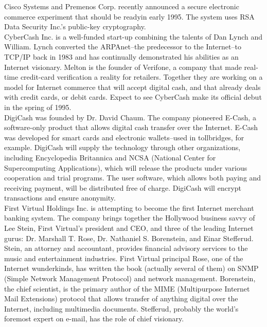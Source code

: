 Cisco Systems and Premenos Corp. recently announced a secure electronic
commerce experiment that should be readyin early 1995. The system uses
RSA Data Security Inc.'s public-key cryptography.\\

CyberCash Inc. is a well-funded start-up combining the talents of Dan
Lynch and William. Lynch converted the ARPAnet--the predecessor to the
Internet--to TCP/IP back in 1983 and has continually demonstrated his
abilities as an Internet visionary. Melton is the founder of Verifone,
a company that made real-time credit-card verification a reality for
retailers. Together they are working on a model for Internet commerce
that will accept digital cash, and that already deals with credit
cards, or debit cards. Expect to see CyberCash make its official debut
in the spring of 1995.\\

DigiCash was founded by Dr. David Chaum. The company pioneered E-Cash,
a software-only product that allows digital cash transfer over the
Internet. E-Cash was developed for smart cards and electronic
wallets--used in tollbridges, for example. DigiCash will supply the
technology through other organizations, including Encyclopedia
Britannica and NCSA (National Center for Supercomputing Applications),
which will release the products under various cooperation and trial
programs. The user software, which allows both paying and receiving
payment, will be distributed free of charge. DigiCash will encrypt
transactions and ensure anonymity.\\

First Virtual Holdings Inc. is attempting to become the first Internet
merchant banking system. The company brings together the Hollywood
business savvy of Lee Stein, First Virtual's president and CEO, and
three of the leading Internet gurus: Dr. Marshall T. Rose, Dr.
Nathaniel S. Borenstein, and Einar Stefferud.\\

Stein, an attorney and accountant, provides financial advisory services
to the music and entertainment industries. First Virtual principal
Rose, one of the Internet wunderkinds, has written the book (actually
several of them) on SNMP (Simple Network Management Protocol) and
network management. Borenstein, the chief scientist, is the primary
author of the MIME (Multipurpose Internet Mail Extensions) protocol
that allows transfer of anything digital over the Internet, including
multimedia documents. Stefferud, probably the world's foremost expert
on e-mail, has the role of chief visionary.\\

